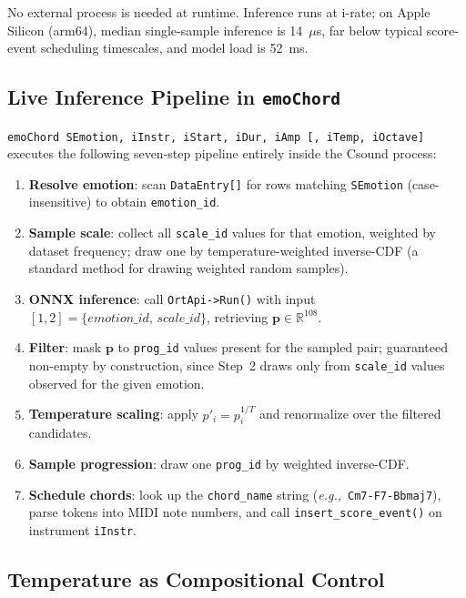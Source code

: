 \documentclass[runningheads,a4paper]{llncs}
\begin{document}
No external process is needed at runtime. Inference runs at i-rate; on Apple
Silicon (arm64), median single-sample inference is 14~$\mu$s, far below typical score-event
scheduling timescales, and model load is 52~ms.

\subsection{Live Inference Pipeline in \texttt{emoChord}}
\label{sec:pipeline}

{\small\texttt{emoChord SEmotion, iInstr, iStart, iDur, iAmp [, iTemp, iOctave]}}
executes the following seven-step pipeline entirely inside the Csound process:

\begin{enumerate}\setlength{\itemsep}{1pt}\setlength{\parskip}{0pt}
\item \textbf{Resolve emotion}: scan \texttt{DataEntry[]} for rows matching
  \texttt{SEmotion} (case-insensitive) to obtain \texttt{emotion\_id}.
\item \textbf{Sample scale}: collect all \texttt{scale\_id} values for that
  emotion, weighted by dataset frequency; draw one by temperature-weighted
  inverse-CDF (a standard method for drawing weighted random samples).
\item \textbf{ONNX inference}: call \texttt{OrtApi->Run()} with input
  $[1,2] = \{\mathit{emotion\_id},\,\mathit{scale\_id}\}$, retrieving
  $\mathbf{p} \in \mathbb{R}^{108}$.
\item \textbf{Filter}: mask $\mathbf{p}$ to \texttt{prog\_id} values present
  for the sampled pair; guaranteed non-empty by construction, since Step~2
  draws only from \texttt{scale\_id} values observed for the given emotion.
\item \textbf{Temperature scaling}: apply $p'_i = p_i^{1/T}$ and renormalize
  over the filtered candidates.
\item \textbf{Sample progression}: draw one \texttt{prog\_id} by weighted
  inverse-CDF.
\item \textbf{Schedule chords}: look up the \texttt{chord\_name} string
  (\textit{e.g.,}~\texttt{Cm7-F7-Bbmaj7}), parse tokens into MIDI note
  numbers, and call \texttt{insert\_score\_event()} on instrument
  \texttt{iInstr}.
\end{enumerate}

\subsection{Temperature as Compositional Control}
\label{sec:temp}
\end{document}
